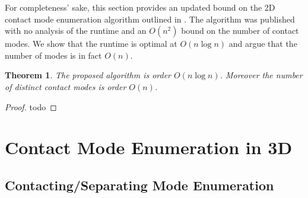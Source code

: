 \documentclass[conference]{IEEEtran}
\newtheorem{theorem}{Theorem}
\begin{document}
For completeness' sake, this section provides an updated bound on the 2D contact
mode enumeration algorithm outlined in \citet{Mason}. The algorithm was
published with no analysis of the runtime and an $O(n^2)$ bound on the number of
contact modes. We show that the runtime is optimal at $O(n\log n)$ and argue
that the number of modes is in fact $O(n)$. 

\begin{theorem}
    The proposed algorithm is order $O(n\log n)$. Moreover the number of
    distinct contact modes is order $O(n)$.
\end{theorem}

\begin{proof}
    todo
\end{proof}

\section{Contact Mode Enumeration in 3D}

\subsection{Contacting/Separating Mode Enumeration}
\end{document}
